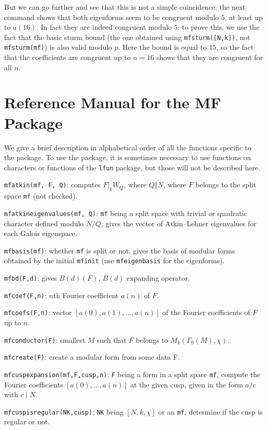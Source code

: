 \documentclass[11pt]{article}
\newcommand{\G}{\Gamma}
\def\kbd#1{{\tt #1}}
\begin{document}
But we can go further and see that this is not a simple coincidence:
the next command shows that both eigenforms seem to be congruent modulo $5$,
at least up to $a(16)$. In fact they are indeed congruent modulo $5$:
to prove this, we use the fact that the basic sturm bound (the one obtained
using \kbd{mfsturm([N,k])}, not \kbd{mfsturm(mf)}) is also valid modulo
$p$. Here the bound is equal to $15$, so the fact that the coefficients
are congruent up to $n=16$ shows that they are congruent for all $n$.

\section{Reference Manual for the MF Package}

We give a brief description in alphabetical order of all the functions
specific to the package. To use the package, it is sometimes necessary to
use functions on characters or functions of the \kbd{lfun} package, but
those will not be described here.

\smallskip

\kbd{mfatkin(mf, F, Q)}: computes $F|_k W_Q$, where $Q\Vert N$, where $F$
belongs to the split space \kbd{mf} (not checked).

\kbd{mfatkineigenvalues(mf, Q)}: \kbd{mf} being a split space with trivial
or quadratic character defined modulo $N/Q$, gives the vector of Atkin--Lehner
eigenvalues for each Galois eigenspace.

\kbd{mfbasis(mf)}: whether \kbd{mf} is split or not, gives the basis of
modular forms obtained by the initial \kbd{mfinit} (use \kbd{mfeigenbasis}
for the eigenforms).

\kbd{mfbd(F,d)}: gives $B(d)(F)$, $B(d)$ expanding operator.

\kbd{mfcoef(F,n)}: $n$th Fourier coefficient $a(n)$ of $F$.

\kbd{mfcoefs(F,n)}: vector $[a(0),a(1),...,a(n)]$ of the Fourier coefficients
of $F$ up to $n$.

\kbd{mfconductor(F)}: smallest $M$ such that $F$ belongs to
$M_k(\G_0(M),\chi)$.

\kbd{mfcreate(F)}: create a modular form from some data F.

\kbd{mfcuspexpansion(mf,F,cusp,n)}: \kbd{F} being a form in a split space
\kbd{mf}, compute the Fourier coefficients $[a(0),...,a(n)]$ at the given cusp,
given in the form $a/c$ with $c\mid N$.

\kbd{mfcuspisregular(NK,cusp)}: \kbd{NK} being $[N,k,\chi]$ or an \kbd{mf},
determine if the cusp is regular or not.
\end{document}
